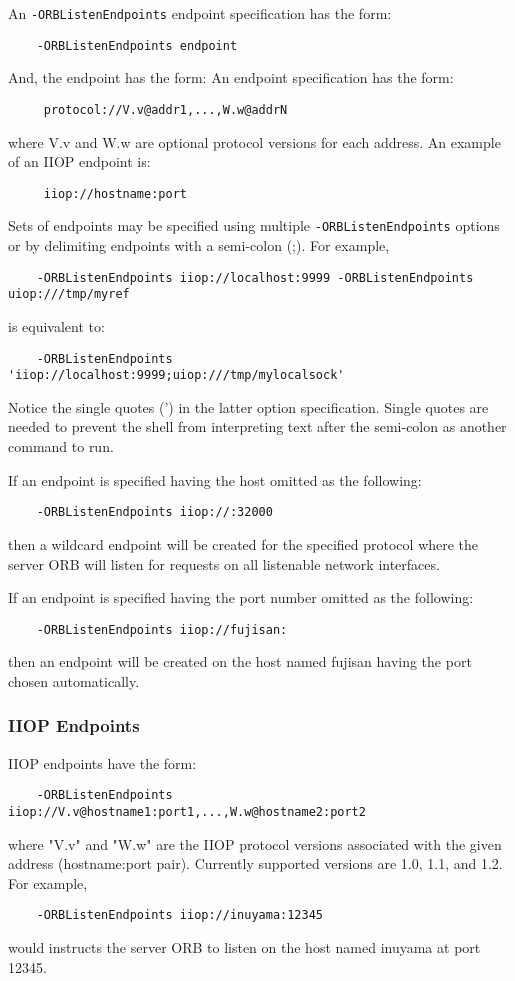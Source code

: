 An {\tt -ORBListenEndpoints} endpoint specification has the form:
\begin{verbatim}
    -ORBListenEndpoints endpoint
\end{verbatim}
And, the endpoint has the form:
An endpoint specification has the form:
\begin{verbatim}
     protocol://V.v@addr1,...,W.w@addrN
\end{verbatim}
where V.v and W.w are optional protocol versions for each address. An example
of an IIOP endpoint is:
\begin{verbatim}
     iiop://hostname:port
\end{verbatim}

Sets of endpoints may be specified using multiple {\tt -ORBListenEndpoints}
options or by delimiting endpoints with a semi-colon (;). For example,
\begin{verbatim}
    -ORBListenEndpoints iiop://localhost:9999 -ORBListenEndpoints uiop:///tmp/myref
\end{verbatim}
is equivalent to:
\begin{verbatim}
    -ORBListenEndpoints 'iiop://localhost:9999;uiop:///tmp/mylocalsock'
\end{verbatim}

Notice the single quotes (') in the latter option specification. Single quotes
are needed to prevent the shell from interpreting text after the semi-colon
as another command to run.

If an endpoint is specified having the host omitted as the following:
\begin{verbatim}
    -ORBListenEndpoints iiop://:32000
\end{verbatim}
then a wildcard endpoint will be created for the specified protocol where the
server ORB will listen for requests on all listenable network interfaces.

If an endpoint is specified having the port number omitted as the following:
\begin{verbatim}
    -ORBListenEndpoints iiop://fujisan:
\end{verbatim}
then an endpoint will be created on the host named fujisan having the port chosen
automatically.

\subsubsection{IIOP Endpoints}
IIOP endpoints have the form:
\begin{verbatim}
    -ORBListenEndpoints iiop://V.v@hostname1:port1,...,W.w@hostname2:port2
\end{verbatim}
where "V.v" and "W.w" are the IIOP protocol versions associated with the given
address (hostname:port pair). Currently supported versions are 1.0, 1.1,
and 1.2.  For example,
\begin{verbatim}
    -ORBListenEndpoints iiop://inuyama:12345
\end{verbatim}
would instructs the server ORB to listen on the host named inuyama at port 12345.

